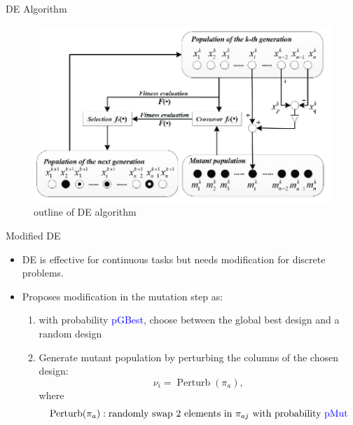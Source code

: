 \documentclass{beamer}
\begin{document}
  \begin{frame}{DE Algorithm}
    \begin{figure}
    \centering
    \includegraphics{images/DE.png}
    \caption{outline of DE algorithm}
    \end{figure}
  \end{frame}

  \begin{frame}{Modified DE}
  \begin{itemize}
    \item DE is effective for continuous tasks but needs modification for discrete problems.
    \item \textcite{stokes2023metaheuristic} Proposes modification in the mutation step as:
    \begin{enumerate}
      \item with probability \textcolor{blue}{pGBest}, choose between the global best design and a random design
      \item Generate mutant population by perturbing the columns of the chosen design:\begin{equation}\label{eq:perturbation}
    \nu_i = \operatorname{Perturb}(\pi_a),
    \end{equation}
where
\[
\operatorname{Perturb}(\pi_a): \text{randomly swap 2 elements in }\pi_{aj} \text{ with probability  \textcolor{blue}{pMut}}
\]
\end{enumerate}
\end{itemize}
\end{frame}
\end{document}
